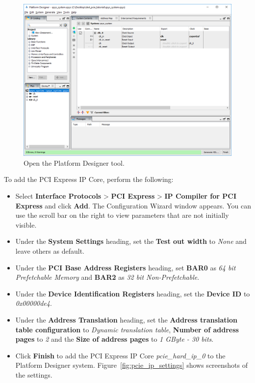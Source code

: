 \documentclass[11pt, twoside, pdftex]{article}
\begin{document}
\begin{figure}[H]
	\centering
	  \includegraphics[scale=0.60]{figures/open_qsys.png}
	\caption{Open the Platform Designer tool.} 
	\label{fig:open_qsys}
\end{figure}

To add the PCI Express IP Core, perform the following:

\begin{itemize}
	\item Select {\bf Interface Protocols} > {\bf PCI Express} > {\bf IP Compiler for PCI Express} and click {\bf Add}. The Configuration Wizard window appears. You can use the scroll bar on the right to view parameters that are not initially visible.
	\item Under the {\bf System Settings} heading, set the {\bf Test out width} to {\it None} and leave others as default. 
	\item Under the {\bf PCI Base Address Registers} heading, set {\bf BAR0} as {\it 64 bit Prefetchable Memory} and {\bf BAR2} as {\it 32 bit Non-Prefetchable}. 
	\item Under the {\bf Device Identification Registers} heading, set the {\bf Device ID} to {\it 0x00000de4}.
	\item Under the {\bf Address Translation} heading, set the {\bf Address translation table configuration} to {\it Dynamic translation table}, {\bf Number of address pages} to {\it 2} and the {\bf Size of address pages} to {\it 1 GByte - 30 bits}.
	\item Click {\bf Finish} to add the PCI Express IP Core {\it pcie\_hard\_ip\_0} to the Platform Designer system. Figure~\ref{fig:pcie_ip_settings} shows screenshots of the settings. 
\end{itemize}
\end{document}
